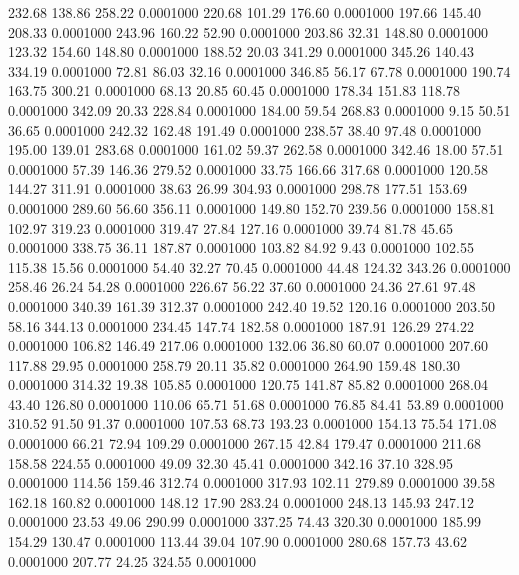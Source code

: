  232.68  138.86  258.22   0.0001000
 220.68  101.29  176.60   0.0001000
 197.66  145.40  208.33   0.0001000
 243.96  160.22   52.90   0.0001000
 203.86   32.31  148.80   0.0001000
 123.32  154.60  148.80   0.0001000
 188.52   20.03  341.29   0.0001000
 345.26  140.43  334.19   0.0001000
  72.81   86.03   32.16   0.0001000
 346.85   56.17   67.78   0.0001000
 190.74  163.75  300.21   0.0001000
  68.13   20.85   60.45   0.0001000
 178.34  151.83  118.78   0.0001000
 342.09   20.33  228.84   0.0001000
 184.00   59.54  268.83   0.0001000
   9.15   50.51   36.65   0.0001000
 242.32  162.48  191.49   0.0001000
 238.57   38.40   97.48   0.0001000
 195.00  139.01  283.68   0.0001000
 161.02   59.37  262.58   0.0001000
 342.46   18.00   57.51   0.0001000
  57.39  146.36  279.52   0.0001000
  33.75  166.66  317.68   0.0001000
 120.58  144.27  311.91   0.0001000
  38.63   26.99  304.93   0.0001000
 298.78  177.51  153.69   0.0001000
 289.60   56.60  356.11   0.0001000
 149.80  152.70  239.56   0.0001000
 158.81  102.97  319.23   0.0001000
 319.47   27.84  127.16   0.0001000
  39.74   81.78   45.65   0.0001000
 338.75   36.11  187.87   0.0001000
 103.82   84.92    9.43   0.0001000
 102.55  115.38   15.56   0.0001000
  54.40   32.27   70.45   0.0001000
  44.48  124.32  343.26   0.0001000
 258.46   26.24   54.28   0.0001000
 226.67   56.22   37.60   0.0001000
  24.36   27.61   97.48   0.0001000
 340.39  161.39  312.37   0.0001000
 242.40   19.52  120.16   0.0001000
 203.50   58.16  344.13   0.0001000
 234.45  147.74  182.58   0.0001000
 187.91  126.29  274.22   0.0001000
 106.82  146.49  217.06   0.0001000
 132.06   36.80   60.07   0.0001000
 207.60  117.88   29.95   0.0001000
 258.79   20.11   35.82   0.0001000
 264.90  159.48  180.30   0.0001000
 314.32   19.38  105.85   0.0001000
 120.75  141.87   85.82   0.0001000
 268.04   43.40  126.80   0.0001000
 110.06   65.71   51.68   0.0001000
  76.85   84.41   53.89   0.0001000
 310.52   91.50   91.37   0.0001000
 107.53   68.73  193.23   0.0001000
 154.13   75.54  171.08   0.0001000
  66.21   72.94  109.29   0.0001000
 267.15   42.84  179.47   0.0001000
 211.68  158.58  224.55   0.0001000
  49.09   32.30   45.41   0.0001000
 342.16   37.10  328.95   0.0001000
 114.56  159.46  312.74   0.0001000
 317.93  102.11  279.89   0.0001000
  39.58  162.18  160.82   0.0001000
 148.12   17.90  283.24   0.0001000
 248.13  145.93  247.12   0.0001000
  23.53   49.06  290.99   0.0001000
 337.25   74.43  320.30   0.0001000
 185.99  154.29  130.47   0.0001000
 113.44   39.04  107.90   0.0001000
 280.68  157.73   43.62   0.0001000
 207.77   24.25  324.55   0.0001000
